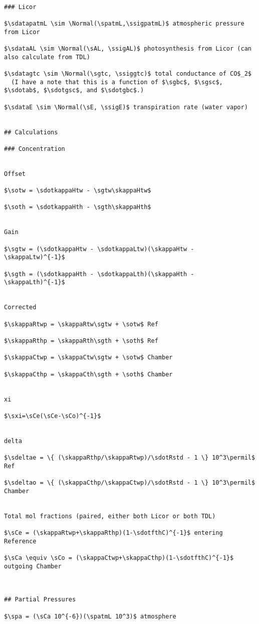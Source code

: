 \documentclass[]{article}
\begin{document}
\begin{verbatim}

### Licor

$\sdatapatmL \sim \Normal(\spatmL,\ssigpatmL)$ atmospheric pressure from Licor

$\sdataAL \sim \Normal(\sAL, \ssigAL)$ photosynthesis from Licor (can also calculate from TDL)

$\sdatagtc \sim \Normal(\sgtc, \ssiggtc)$ total conductance of CO$_2$
  (I have a note that this is a function of $\sgbc$, $\sgsc$, $\sdotab$, $\sdotgsc$, and $\sdotgbc$.)

$\sdataE \sim \Normal(\sE, \ssigE)$ transpiration rate (water vapor)


## Calculations

### Concentration


Offset

$\sotw = \sdotkappaHtw - \sgtw\skappaHtw$

$\soth = \sdotkappaHth - \sgth\skappaHth$


Gain

$\sgtw = (\sdotkappaHtw - \sdotkappaLtw)(\skappaHtw - \skappaLtw)^{-1}$

$\sgth = (\sdotkappaHth - \sdotkappaLth)(\skappaHth - \skappaLth)^{-1}$


Corrected

$\skappaRtwp = \skappaRtw\sgtw + \sotw$ Ref

$\skappaRthp = \skappaRth\sgth + \soth$ Ref

$\skappaCtwp = \skappaCtw\sgtw + \sotw$ Chamber

$\skappaCthp = \skappaCth\sgth + \soth$ Chamber


xi

$\sxi=\sCe(\sCe-\sCo)^{-1}$


delta

$\sdeltae = \{ (\skappaRthp/\skappaRtwp)/\sdotRstd - 1 \} 10^3\permil$ Ref

$\sdeltao = \{ (\skappaCthp/\skappaCtwp)/\sdotRstd - 1 \} 10^3\permil$ Chamber


Total mol fractions (paired, either both Licor or both TDL)

$\sCe = (\skappaRtwp+\skappaRthp)(1-\sdotfthC)^{-1}$ entering Reference

$\sCa \equiv \sCo = (\skappaCtwp+\skappaCthp)(1-\sdotfthC)^{-1}$ outgoing Chamber



## Partial Pressures

$\spa = (\sCa 10^{-6})(\spatmL 10^3)$ atmosphere


\end{verbatim}
\end{document}
